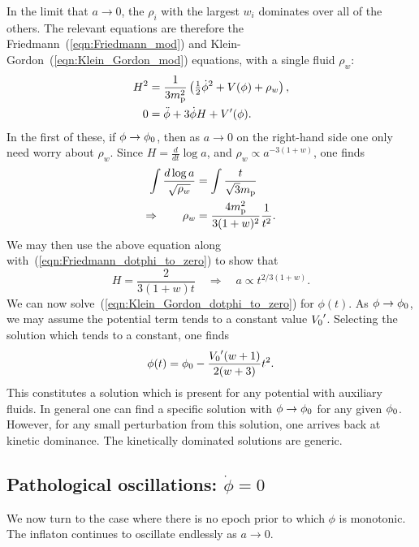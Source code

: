 In the limit that $a\to 0$, the $\rho_i$ with the largest $w_i$ dominates over all of the others. The relevant equations are therefore the Friedmann~(\ref{eqn:Friedmann_mod}) and Klein-Gordon~(\ref{eqn:Klein_Gordon_mod}) equations, with a single fluid $\rho_w$:
%
\begin{align}
  H^2
  &=
  \frac{1}{3m_{\mathrm{p}}^2}\left({\textstyle\frac{1}{2}}\dot{\phi}^2
  + V(\phi)
  + \rho_w \right),
  \label{eqn:Friedmann_dotphi_to_zero} \\
  0
  &=
  \ddot{\phi} +3\dot{\phi}H + V^\prime(\phi).
  \label{eqn:Klein_Gordon_dotphi_to_zero}
\end{align}
%
In the first of these, if $\phi\to\phi_0$, then as $a\to0$ on the right-hand side one only need worry about $\rho_w$. Since $H=\frac{d}{dt}\log a$, and $\rho_w\propto a^{-3(1+w)}$, one finds
%
\begin{align}
  \int\frac{d\log a}{\sqrt{\rho_w}}
  &=
  \int\frac{t}{\sqrt3m_{\mathrm{p}}}
  \\
  \Rightarrow \qquad \rho_w
  &=
  \frac{4m_{\mathrm{p}}^2}{3(1+w)^2} \frac{1}{t^2}.
  \label{eqn:rho_dotphi_to_zero}
\end{align}
%
We may then use the above equation along with~(\ref{eqn:Friedmann_dotphi_to_zero}) to show that
%
\begin{equation}
  H = \frac{2}{3(1+w) t}
  \quad
  \Rightarrow \quad a\propto t^{2/3(1+w)}.
  \label{eqn:H_dotphi_to_zero}
\end{equation}
%
We can now solve~(\ref{eqn:Klein_Gordon_dotphi_to_zero}) for $\phi(t)$.  As $\phi\to\phi_0$, we may assume the potential term tends to a constant value ${{V_0}^\prime}$. Selecting the solution which tends to a constant, one finds
%
\begin{equation}
  \phi(t) = \phi_0 -\frac{{{V_0}^\prime}(w+1)}{2(w+3)}t^2.
\end{equation}
%
This constitutes a solution which is present for any potential with auxiliary fluids. In general one can find a specific solution with $\phi\to\phi_0$ for any given $\phi_0$. However, for any small perturbation from this solution, one arrives back at kinetic dominance. The kinetically dominated solutions are generic. 












\subsection{Pathological oscillations: $\dot{\phi}=0$}
We now turn to the case where there is no epoch prior to which $\phi$ is monotonic. The inflaton continues to oscillate endlessly as $a\to0$. 

